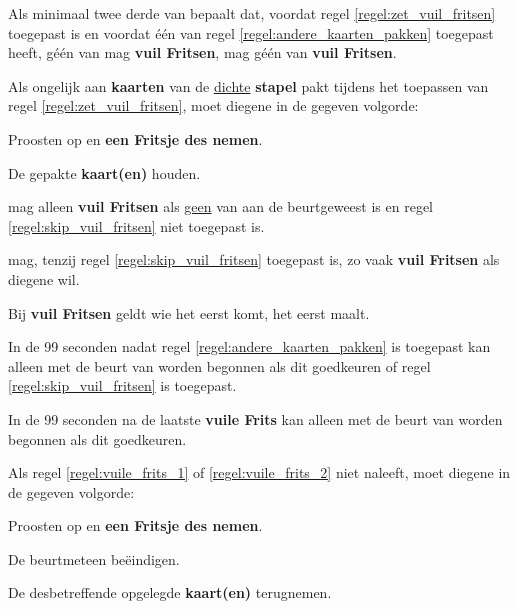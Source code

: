 \vervolgLijst{}
\item Als minimaal twee derde van \alleSpelers bepaalt dat, voordat regel \ref{regel:zet_vuil_fritsen} toegepast is en voordat \'e\'en van \alleSpelers regel \ref{regel:andere_kaarten_pakken} toegepast heeft, géén van \alleSpelers mag \textbf{vuil Fritsen}, mag géén van \alleSpelers \textbf{vuil Fritsen}.
\label{regel:skip_vuil_fritsen}
\eindLijst{}

\vervolgLijst{}
\item Als \eenSpeler ongelijk aan \Frits \textbf{kaarten} van de \ul{dichte} \textbf{stapel} pakt tijdens het toepassen van regel \ref{regel:zet_vuil_fritsen}, moet diegene in de gegeven volgorde:
\puntLijst{}
\item Proosten op  en \textbf{een Fritsje des nemen}\footnotemark[4].
\item De gepakte \textbf{kaart(en)} houden.
\eindPuntLijst{}
\eindLijst{}

\vervolgLijst{}
\item \EenSpeler mag alleen \textbf{vuil Fritsen} als \ul{geen} van \alleSpelers aan de beurt\footnotemark[1] geweest is en regel \ref{regel:skip_vuil_fritsen} niet toegepast is.
\eindLijst{}

\vervolgLijst{}
\item \EenSpeler mag, tenzij regel \ref{regel:skip_vuil_fritsen} toegepast is, zo vaak \textbf{vuil Fritsen} als diegene wil.
\eindLijst{}

\vervolgLijst{}
\item Bij \textbf{vuil Fritsen} geldt wie het eerst komt, het eerst maalt.
\eindLijst{}


\vervolgLijst{}
\item In de 99 seconden nadat regel \ref{regel:andere_kaarten_pakken} is toegepast kan alleen met de beurt van \Willem worden begonnen als \alleSpelers dit goedkeuren of regel \ref{regel:skip_vuil_fritsen} is toegepast.
\label{regel:vuile_frits_1}
\eindLijst{}

\vervolgLijst{}
\item In de 99 seconden na de laatste \textbf{vuile Frits} kan alleen met de beurt van \Willem worden begonnen als \alleSpelers dit goedkeuren.
\label{regel:vuile_frits_2}
\eindLijst{}

\vervolgLijst{}
\item Als \Willem regel \ref{regel:vuile_frits_1} of \ref{regel:vuile_frits_2} niet naleeft, moet diegene in de gegeven volgorde:
\puntLijst{}
\item Proosten op  en \textbf{een Fritsje des nemen}\footnotemark[4].
\item De beurt\footnotemark[1] meteen beëindigen.
\item De desbetreffende opgelegde \textbf{kaart(en)} terugnemen.
\eindPuntLijst{}
\label{regel:kaarten_terugnemen_1}
\eindLijst{}

